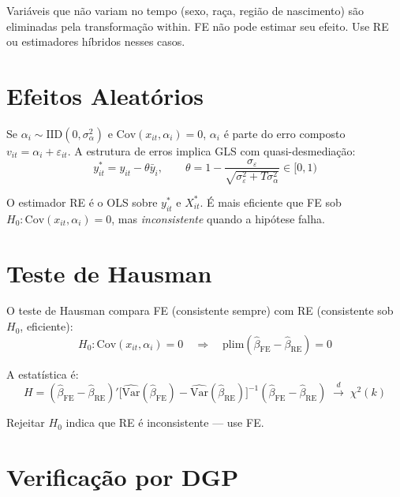 \begin{aviso}
  Variáveis que não variam no tempo (sexo, raça, região de nascimento) são
  eliminadas pela transformação within. FE não pode estimar seu efeito.
  Use RE ou estimadores híbridos nesses casos.
\end{aviso}

\section{Efeitos Aleatórios}

Se $\alpha_i \sim \mathrm{IID}(0, \sigma^2_\alpha)$ e
$\mathrm{Cov}(x_{it}, \alpha_i) = 0$, $\alpha_i$ é parte do erro composto
$v_{it} = \alpha_i + \varepsilon_{it}$. A estrutura de erros implica GLS com
quasi-desmediação:
\[
  y^*_{it} = y_{it} - \theta\bar{y}_i,
  \qquad
  \theta = 1 - \frac{\sigma_\varepsilon}{\sqrt{\sigma^2_\varepsilon + T\sigma^2_\alpha}}
  \in [0,1)
\]

O estimador RE é o OLS sobre $y^*_{it}$ e $X^*_{it}$. É mais eficiente que
FE sob $H_0: \mathrm{Cov}(x_{it},\alpha_i) = 0$, mas \emph{inconsistente}
quando a hipótese falha.

\section{Teste de Hausman}

O teste de Hausman compara FE (consistente sempre) com RE (consistente sob
$H_0$, eficiente):
\[
  H_0: \mathrm{Cov}(x_{it}, \alpha_i) = 0
  \quad\Longrightarrow\quad
  \mathrm{plim}(\hat\beta_{\mathrm{FE}} - \hat\beta_{\mathrm{RE}}) = 0
\]

A estatística é:
\[
  H = (\hat\beta_{\mathrm{FE}} - \hat\beta_{\mathrm{RE}})'
      \bigl[\widehat{\mathrm{Var}}(\hat\beta_{\mathrm{FE}}) -
             \widehat{\mathrm{Var}}(\hat\beta_{\mathrm{RE}})\bigr]^{-1}
      (\hat\beta_{\mathrm{FE}} - \hat\beta_{\mathrm{RE}})
  \;\xrightarrow{d}\; \chi^2(k)
\]

Rejeitar $H_0$ indica que RE é inconsistente — use FE.

\section{Verificação por DGP}

